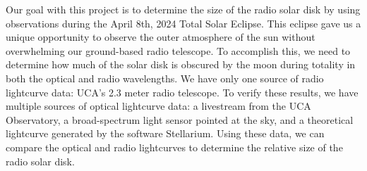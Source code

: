 Our goal with this project is to determine the size of the radio solar disk by using observations during the April 8th, 2024 Total Solar Eclipse.
This eclipse gave us a unique opportunity to observe the outer atmosphere of the sun without overwhelming our ground-based radio telescope.
To accomplish this, we need to determine how much of the solar disk is obscured by the moon during totality in both the optical and radio wavelengths.
We have only one source of radio lightcurve data: UCA's 2.3 meter radio telescope.
To verify these results, we have multiple sources of optical lightcurve data: a livestream from the UCA Observatory, a broad-spectrum light sensor pointed at the sky, and a theoretical lightcurve generated by the software Stellarium.
Using these data, we can compare the optical and radio lightcurves to determine the relative size of the radio solar disk.